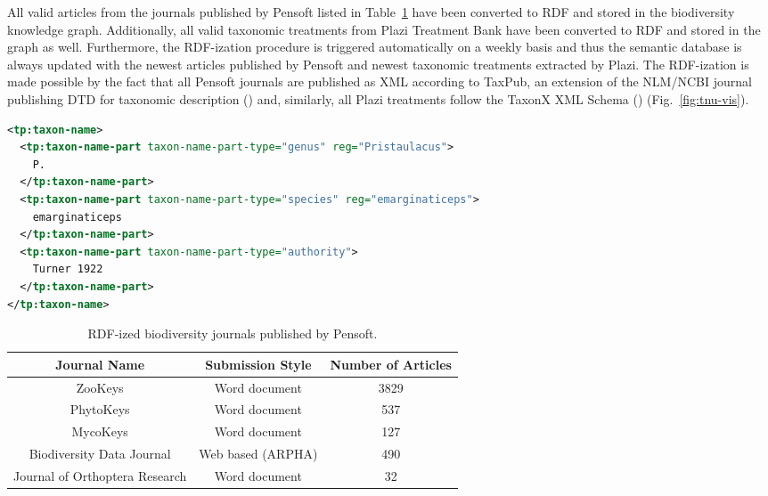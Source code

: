 All valid articles from the journals published by Pensoft listed in Table~\ref{rdf-pensoft-journals} have been converted to RDF and stored in the biodiversity knowledge graph. Additionally, all valid taxonomic treatments from Plazi Treatment Bank have been converted to RDF and stored in the graph as well. Furthermore, the RDF-ization procedure is triggered automatically on a weekly basis and thus the semantic database is always updated with the newest articles published by Pensoft and newest taxonomic treatments extracted by Plazi. The RDF-ization is made possible by the fact that all Pensoft journals are published as XML according to TaxPub, an extension of the NLM/NCBI journal publishing DTD for taxonomic description (\cite{catapano_taxpub:_2010}) and, similarly, all Plazi treatments follow the TaxonX XML Schema (\cite{penev_xml_2011}) (Fig.~\ref{fig:tnu-vis}).

\begin{lstlisting}[language=XML,
caption=Taxonomic name usage of the name \emph{P. emarginaticeps} in Taxpub. Name parts are tagged with {\tt tp:taxon-name-part} and the expansion of abbreviations (regularization) is marked up with the attribute {\tt reg},
label=listing:tnu, basicstyle=\ttfamily\tiny]
<tp:taxon-name>
  <tp:taxon-name-part taxon-name-part-type="genus" reg="Pristaulacus">
    P.
  </tp:taxon-name-part>
  <tp:taxon-name-part taxon-name-part-type="species" reg="emarginaticeps">
    emarginaticeps
  </tp:taxon-name-part>
  <tp:taxon-name-part taxon-name-part-type="authority">
    Turner 1922
  </tp:taxon-name-part>
</tp:taxon-name> 
\end{lstlisting}

\begin{table}[h!]
\caption{RDF-ized biodiversity journals published by Pensoft.}
      \begin{tabular}{ccc}
        \hline
          Journal Name             & Submission Style & Number of Articles\\  \hline
          ZooKeys                 & Word document & 3829\\
          PhytoKeys               & Word document & 537\\
          MycoKeys                & Word document & 127\\
          Biodiversity Data Journal & Web based (ARPHA) & 490\\
          Journal of Orthoptera Research & Word document & 32
      \end{tabular}
      \label{rdf-pensoft-journals}
\end{table}

